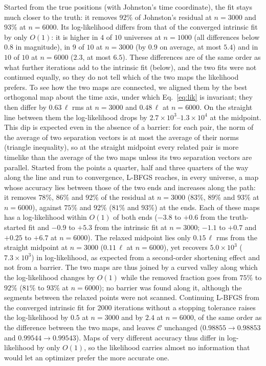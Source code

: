 \documentclass[prd,twocolumn,superscriptaddress,nofootinbib,amsmath,amssymb,floatfix]{revtex4-2}
\begin{document}
Started from the true positions (with Johnston's time coordinate), the fit stays much closer to the truth: it removes $92\%$ of Johnston's residual at $n=3000$ and $93\%$ at $n=6000$. Its log-likelihood differs from that of the converged intrinsic fit by only $O(1)$: it is higher in $4$ of $10$ universes at $n=1000$ (all differences below $0.8$ in magnitude), in $9$ of $10$ at $n=3000$ (by $0.9$ on average, at most $5.4$) and in $10$ of $10$ at $n=6000$ ($2.3$, at most $6.5$). These differences are of the same order as what further iterations add to the intrinsic fit (below), and the two fits were not continued equally, so they do not tell which of the two maps the likelihood prefers. To see how the two maps are connected, we aligned them by the best orthogonal map about the time axis, under which Eq.~\eqref{eq:lik} is invariant; they then differ by $0.63\,\ell$ rms at $n=3000$ and $0.48\,\ell$ at $n=6000$. On the straight line between them the log-likelihood drops by $2.7\times10^3$--$1.3\times10^4$ at the midpoint. This dip is expected even in the absence of a barrier: for each pair, the norm of the average of two separation vectors is at most the average of their norms (triangle inequality), so at the straight midpoint every related pair is more timelike than the average of the two maps unless its two separation vectors are parallel. Started from the points a quarter, half and three quarters of the way along the line and run to convergence, L-BFGS reaches, in every universe, a map whose accuracy lies between those of the two ends and increases along the path: it removes $78\%$, $86\%$ and $92\%$ of the residual at $n=3000$ ($83\%$, $89\%$ and $93\%$ at $n=6000$), against $75\%$ and $92\%$ ($81\%$ and $93\%$) at the ends. Each of these maps has a log-likelihood within $O(1)$ of both ends ($-3.8$ to $+0.6$ from the truth-started fit and $-0.9$ to $+5.3$ from the intrinsic fit at $n=3000$; $-1.1$ to $+0.7$ and $+0.25$ to $+6.7$ at $n=6000$). The relaxed midpoint lies only $0.15\,\ell$ rms from the straight midpoint at $n=3000$ ($0.11\,\ell$ at $n=6000$), yet recovers $5.0\times10^3$ ($7.3\times10^3$) in log-likelihood, as expected from a second-order shortening effect and not from a barrier. The two maps are thus joined by a curved valley along which the log-likelihood changes by $O(1)$ while the removed fraction goes from $75\%$ to $92\%$ ($81\%$ to $93\%$ at $n=6000$); no barrier was found along it, although the segments between the relaxed points were not scanned. Continuing L-BFGS from the converged intrinsic fit for 2000 iterations without a stopping tolerance raises the log-likelihood by $0.5$ at $n=3000$ and by $2.4$ at $n=6000$, of the same order as the difference between the two maps, and leaves $\mathcal C$ unchanged ($0.98855\to0.98853$ and $0.99544\to0.99543$). Maps of very different accuracy thus differ in log-likelihood by only $O(1)$, so the likelihood carries almost no information that would let an optimizer prefer the more accurate one.
\end{document}
